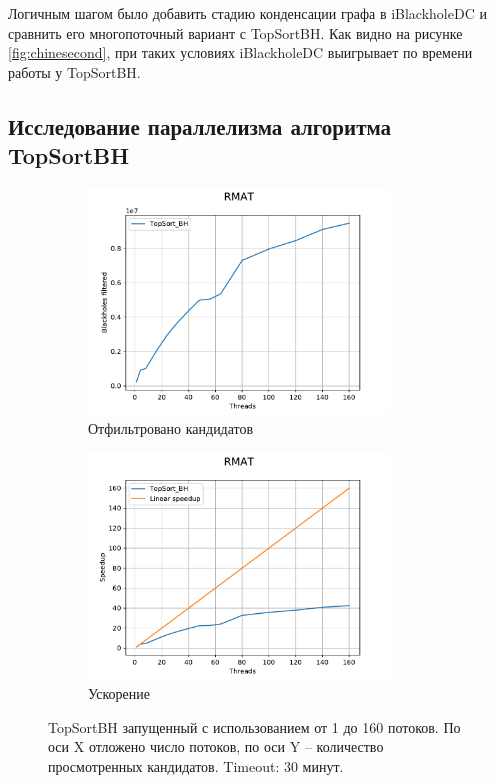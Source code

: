 \documentclass[12pt,a4paper,oneside,openany]{article}
\theoremstyle{definition}
\theoremstyle{lemma}
\theoremstyle{remark}
\begin{document}
Логичным шагом было добавить стадию конденсации графа в iBlackholeDC и сравнить его
многопоточный вариант с TopSortBH. Как видно на рисунке \ref{fig:chinesecond},
при таких условиях iBlackholeDC выигрывает по времени работы у TopSortBH.

\subsection{Исследование параллелизма алгоритма TopSortBH}\label{subsec:topsortasync}

\begin{figure}[H]
    \begin{subfigure}{.5\textwidth}
        \centering
        \includegraphics[width=8cm]{images/many_threads_RMAT.pdf}
        \caption{Отфильтровано кандидатов}
        \label{subfig:manythreads:speedup}
    \end{subfigure}
    \begin{subfigure}{.5\textwidth}
        \centering
        \includegraphics[width=8cm]{images/many_threads_RMAT_speedup.pdf}
        \caption{Ускорение}
        \label{subfig:manythreads:speedup}
    \end{subfigure}
    \caption{TopSortBH запущенный с использованием от 1 до 160 потоков.
По оси X отложено число потоков, по оси Y -- количество просмотренных кандидатов. Timeout: 30 минут.}
    \label{fig:manythreads}
\end{figure}
\end{document}
